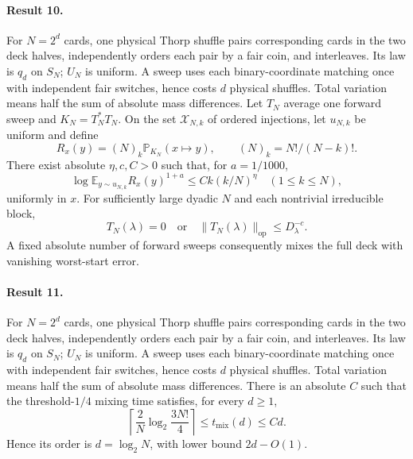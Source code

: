 \documentclass[11pt]{article}
\begin{document}
\paragraph{Result 10.} For $N=2^d$ cards, one physical Thorp shuffle pairs corresponding cards in the two deck halves, independently orders each pair by a fair coin, and interleaves. Its law is $q_d$ on $S_N$; $U_N$ is uniform. A sweep uses each binary-coordinate matching once with independent fair switches, hence costs $d$ physical shuffles. Total variation means half the sum of absolute mass differences. Let $T_N$ average one forward sweep and $K_N=T_N^*T_N$. On the set $\mathcal X_{N,k}$ of ordered injections, let $u_{N,k}$ be uniform and define
\[
 R_x(y)=(N)_k\mathbb P_{K_N}(x\mapsto y),\qquad (N)_k=N!/(N-k)!.
\]
There exist absolute $\eta,c,C>0$ such that, for $a=1/1000$,
\[
 \log\mathbb E_{y\sim u_{N,k}}R_x(y)^{1+a}\le Ck(k/N)^\eta\quad(1\le k\le N),
\]
uniformly in $x$. For sufficiently large dyadic $N$ and each nontrivial irreducible block,
\[
 T_N(\lambda)=0\quad\text{or}\quad\|T_N(\lambda)\|_{\mathrm{op}}\le D_\lambda^{-c}.
\]
A fixed absolute number of forward sweeps consequently mixes the full deck with vanishing worst-start error.

\paragraph{Result 11.} For $N=2^d$ cards, one physical Thorp shuffle pairs corresponding cards in the two deck halves, independently orders each pair by a fair coin, and interleaves. Its law is $q_d$ on $S_N$; $U_N$ is uniform. A sweep uses each binary-coordinate matching once with independent fair switches, hence costs $d$ physical shuffles. Total variation means half the sum of absolute mass differences. There is an absolute $C$ such that the threshold-$1/4$ mixing time satisfies, for every $d\ge1$,
\[
 \left\lceil\frac2N\log_2\frac{3N!}{4}\right\rceil\le t_{\mathrm{mix}}(d)\le Cd.
\]
Hence its order is $d=\log_2N$, with lower bound $2d-O(1)$.
\end{document}
